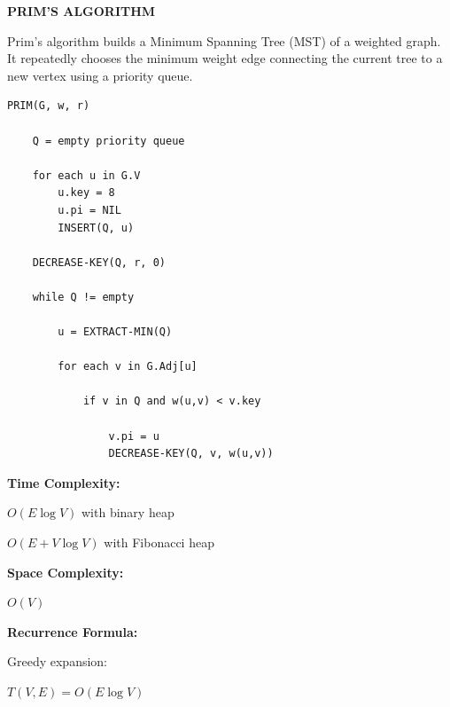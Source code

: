 \documentclass[a4paper,12pt]{article}
\begin{document}
\begin{tcolorbox}[
    colback=gray!30,
    colframe=black,
    boxrule=1pt,
    arc=0mm
]

\begin{tcolorbox}[
    colback=gray!10,
    colframe=black,
    arc=0mm
]
\centering
{\Huge\bfseries PRIM'S ALGORITHM}
\end{tcolorbox}


\begin{tcolorbox}[
    colback=gray!10,
    colframe=black,
    arc=0mm
]
\small
Prim's algorithm builds a Minimum Spanning Tree (MST) of a weighted graph.
It repeatedly chooses the minimum weight edge connecting the current tree
to a new vertex using a priority queue.
\end{tcolorbox}


\begin{tcolorbox}[
    colback=black!5,
    colframe=black,
    arc=0mm,
    title=Pseudo-code
]
\tiny
\begin{lstlisting}
PRIM(G, w, r)

    Q = empty priority queue

    for each u in G.V
        u.key = 8
        u.pi = NIL
        INSERT(Q, u)

    DECREASE-KEY(Q, r, 0)

    while Q != empty

        u = EXTRACT-MIN(Q)

        for each v in G.Adj[u]

            if v in Q and w(u,v) < v.key

                v.pi = u
                DECREASE-KEY(Q, v, w(u,v))
\end{lstlisting}
\end{tcolorbox}


\begin{tcolorbox}[
    colback=cyan!20,
    colframe=black,
    arc=0mm
]
\small
\textbf{Time Complexity:}

$O(E \log V)$ with binary heap

$O(E + V \log V)$ with Fibonacci heap
\end{tcolorbox}


\begin{tcolorbox}[
    colback=violet!20,
    colframe=black,
    arc=0mm
]
\small
\textbf{Space Complexity:}

$O(V)$
\end{tcolorbox}


\begin{tcolorbox}[
    colback=pink!20,
    colframe=black,
    arc=0mm
]
\small
\textbf{Recurrence Formula:}

Greedy expansion:

$T(V,E)=O(E\log V)$
\end{tcolorbox}

\end{tcolorbox}
\end{document}
